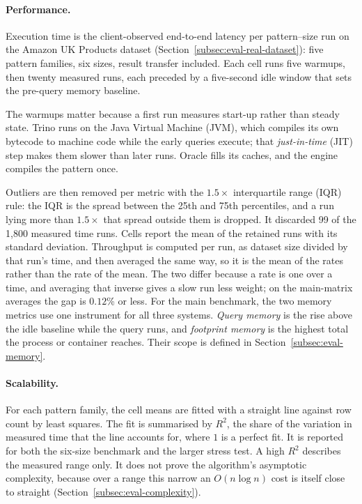 \paragraph{Performance.}
Execution time is the client-observed end-to-end latency per
pattern--size run on the Amazon UK Products dataset
(Section~\ref{subsec:eval-real-dataset}): five pattern families, six
sizes, result transfer included.  Each cell runs five warmups, then
twenty measured runs, each preceded by a five-second idle window that
sets the pre-query memory baseline.

The warmups matter because a first run measures start-up rather than
steady state.  Trino runs on the Java Virtual Machine (JVM), which
compiles its own bytecode
to machine code while the early queries execute; that
\emph{just-in-time} (JIT) step makes them slower than later runs.
Oracle fills its caches, and the engine compiles the pattern once.

Outliers are then removed per metric with the $1.5\times$ interquartile
range (IQR) rule: the IQR is the spread between the 25th and 75th
percentiles, and a run lying more than $1.5\times$ that spread outside
them is dropped.  It discarded 99 of the 1{,}800 measured time runs.
Cells report the mean of the retained runs with its standard deviation.
Throughput is computed per run, as dataset size divided by that run's
time, and then averaged the same way, so it is the mean of the rates
rather than the rate of the mean.  The two differ because a rate is one
over a time, and averaging that inverse gives a slow run less weight;
on the main-matrix averages the gap is $0.12$\% or less.  For the main
benchmark, the two
memory metrics use one instrument for all three systems.
\emph{Query memory} is the rise above the idle baseline while the query
runs, and \emph{footprint memory} is the highest total the process or
container reaches.  Their scope is defined in
Section~\ref{subsec:eval-memory}.

\paragraph{Scalability.}
For each pattern family, the cell means are fitted with a straight
line against row count by least squares.  The fit is summarised by
$R^2$, the share of the variation in measured time that the line
accounts for, where $1$ is a perfect fit.  It is reported for both the
six-size benchmark and the larger stress test.  A high $R^2$ describes
the measured range only.  It does not prove the algorithm's asymptotic
complexity, because over a range this narrow an $O(n \log n)$ cost is
itself close to straight
(Section~\ref{subsec:eval-complexity}).

